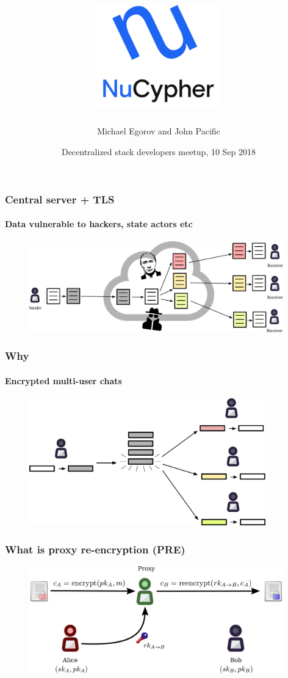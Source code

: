 \documentclass[xetex,mathsans,sans,aspectratio=169]{beamer}
\title[Building end-to-end encrypted decentralized applications with nucypher]{\includegraphics[width=5.5cm]{pdf/nucypher_logo.pdf}}
\author[Michael and John]{Michael Egorov and John Pacific}
\date[10 Sep]{Decentralized stack developers meetup, 10 Sep 2018}
\begin{document}
    \begin{frame}
        \titlepage
    \end{frame}

    \begin{frame}
        \frametitle{Central server + TLS}
        \framesubtitle{Data vulnerable to hackers, state actors etc}
        \begin{figure}
            \centering
            \includegraphics[width=11cm]{pdf/file-sharing-tls.pdf}
        \end{figure}
    \end{frame}

    \begin{frame}
        \frametitle{Why}
        \framesubtitle{Encrypted multi-user chats}
        \begin{figure}
            \centering
            \includegraphics[height=5.5cm]{pdf/chats.pdf}
        \end{figure}
    \end{frame}

    \begin{frame}
        \frametitle{What is proxy re-encryption (PRE)}
        \begin{figure}
            \centering
            \includegraphics[width=11cm]{pdf/pre.pdf}
        \end{figure}
    \end{frame}
\end{document}
